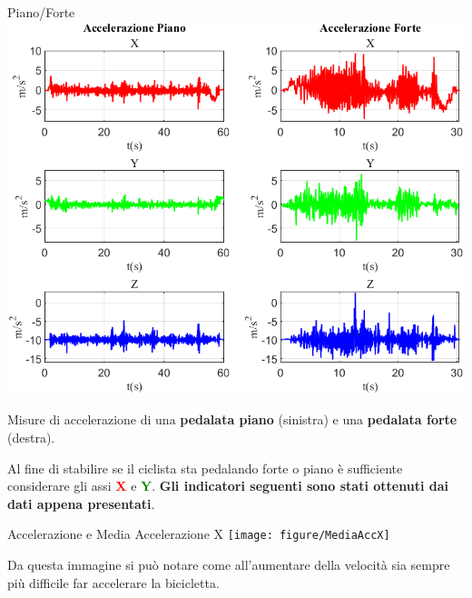 \documentclass[a4paper, 9pt]{beamer}
\begin{document}
	\begin{frame}{{Piano/Forte}}
		\centering\includegraphics[height=.5\textheight]{figure/lungaFP_accXY}
		
		\vspace{.05\textheight}
		Misure di accelerazione di una \textbf{pedalata piano} (sinistra) e una \textbf{pedalata forte} (destra).
		
		Al fine di stabilire se il ciclista sta pedalando forte o piano è sufficiente considerare gli assi \textcolor{red}{\textbf{X}} e \textcolor{green}{\textbf{Y}}.
		\newline
		\newline
		\textbf{Gli indicatori seguenti sono stati ottenuti dai dati appena presentati}.
	\end{frame}
	
	\begin{frame}{{Accelerazione e Media Accelerazione X}}
			\centering\texttt{[image: figure/MediaAccX]}
			\vspace{.05\textheight}
			
			Da questa immagine si può notare come all'aumentare della velocità sia sempre più difficile far accelerare la bicicletta.		
	\end{frame}
	
\end{document}
